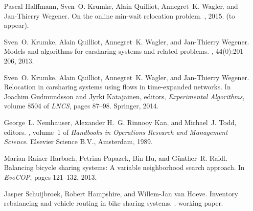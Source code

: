 \documentclass[english]{llncs}
\numberwithin{sublemma}{lemma}
\begin{document}
\begin{thebibliography}{10}
Pascal Halffmann, Sven~O. Krumke, Alain Quilliot, Annegret~K. Wagler, and
  Jan-Thierry Wegener.
\newblock On the online min-wait relocation problem.
, 2015.
\newblock (to appear).

Sven~O. Krumke, Alain Quilliot, Annegret~K. Wagler, and Jan-Thierry Wegener.
\newblock Models and algorithms for carsharing systems and related problems.
, 44(0):201 -- 206,
  2013.

Sven~O. Krumke, Alain Quilliot, Annegret~K. Wagler, and Jan-Thierry Wegener.
\newblock Relocation in carsharing systems using flows in time-expanded
  networks.
\newblock In Joachim Gudmundsson and Jyrki Katajainen, editors, {\em
  Experimental Algorithms}, volume 8504 of {\em LNCS}, pages 87--98. Springer,
  2014.

George~L. Nemhauser, Alexander H.~G. {Rinnooy Kan}, and Michael~J. Todd,
  editors.
, volume~1 of {\em Handbooks in Operations Research
  and Management Science}.
\newblock Elsevier Science B.V., Amsterdam, 1989.

Marian Rainer-Harbach, Petrina Papazek, Bin Hu, and G{\"u}nther~R. Raidl.
\newblock Balancing bicycle sharing systems: A variable neighborhood search
  approach.
\newblock In {\em EvoCOP}, pages 121--132, 2013.

Jasper Schuijbroek, Robert Hampshire, and Willem-Jan van Hoeve.
\newblock Inventory rebalancing and vehicle routing in bike sharing systems.
.
\newblock working paper.

\end{thebibliography}
\end{document}
